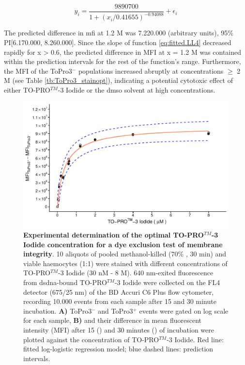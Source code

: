 \begin{equation}
\label{eq:fitted.LL4}
y_{i} = \dfrac{9890700}{1 + (x_i / 0.41655)^{-0.94088}} + \epsilon_i
\end{equation}

The predicted difference in \acrshort{mfi} at 1.2 \micro M was 7.220.000 (arbitrary units), 95\% PI[6.170.000, 8.260.000]. Since the slope of function \ref{eq:fitted.LL4} decreased rapidly for x > 0.6, the predicted difference in MFI at x = 1.2 \micro M was contained within the prediction intervals for the rest of the function's range. Furthermore, the MFI of the ToPro3$^{-}$ populations increased abruptly at concentrations $\geq$ 2 \micro M (see Table \ref{tb:ToPro3_stainopt}), indicating a potential cytotoxic effect of either TO-PRO$^{TM}$-3 Iodide or the \acrshort{dmso} solvent at high concentrations.

\begin{figure}[h]
    \centering
    \includegraphics[width=1.0\textwidth]{figures/Method development/ToPro3 LL4.pdf}
    \caption{\textbf{Experimental determination of the optimal TO-PRO$^{TM}$-3 Iodide concentration for a dye exclusion test of membrane integrity}. 10 aliquots of pooled methanol-killed (70\% , 30 min) and viable haemocytes (1:1) were stained with different concentrations of TO-PRO$^{TM}$-3 Iodide (30 nM - 8 \micro M). 640 nm-exited fluorescence from \acrshort{dsdna}-bound TO-PRO$^{TM}$-3 Iodide were collected on the FL4 detector (675/25 nm) of the BD Accuri C6 Plus flow cytometer, recording 10.000 events from each sample after 15 and 30 minute incubation. \textbf{A)} ToPro3$^{-}$ and ToPro3$^{+}$ events were gated on log scale for each sample, \textbf{B)} and their difference in mean fluorescent intensity (MFI) after 15 (\protect\lysegraacircle) and 30 minutes (\protect\darkgraycircle) of incubation were plotted against the concentration of TO-PRO$^{TM}$-3 Iodide. Red line: fitted log-logistic regression model; blue dashed lines: prediction intervals.}
    \label{fig:ToPro3_stain_opt}
\end{figure}

